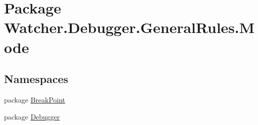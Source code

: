 \hypertarget{namespace_watcher_1_1_debugger_1_1_general_rules_1_1_mode}{\section{Package Watcher.\+Debugger.\+General\+Rules.\+Mode}
\label{namespace_watcher_1_1_debugger_1_1_general_rules_1_1_mode}
}
\subsection*{Namespaces}
\begin{DoxyCompactItemize}
\item 
package \hyperlink{namespace_watcher_1_1_debugger_1_1_general_rules_1_1_mode_1_1_break_point}{Break\+Point}
\item 
package \hyperlink{namespace_watcher_1_1_debugger_1_1_general_rules_1_1_mode_1_1_debugger}{Debugger}
\end{DoxyCompactItemize}

